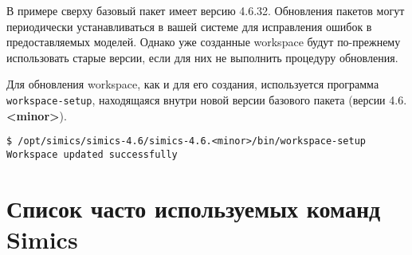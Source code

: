 В примере сверху базовый пакет имеет версию 4.6.32. Обновления пакетов могут периодически устанавливаться в вашей системе для исправления ошибок в предоставляемых моделей. Однако уже созданные workspace будут по-прежнему использовать старые версии, если для них не выполнить процедуру обновления. 

Для обновления workspace, как и для его создания, используется программа \texttt{workspace-setup}, находящаяся внутри новой версии базового пакета (версии 4.6.\textbf{<minor>}).

\begin{lstlisting}
$ /opt/simics/simics-4.6/simics-4.6.<minor>/bin/workspace-setup
Workspace updated successfully
\end{lstlisting}

\section{Список часто используемых команд Simics}

